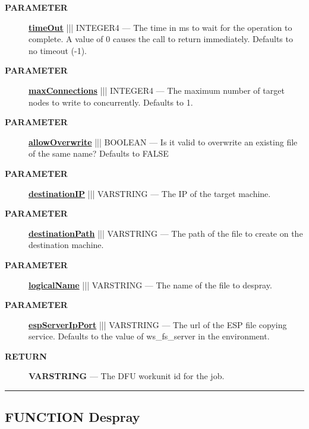 \par
\begin{description}
\item [\colorbox{tagtype}{\color{white} \textbf{\textsf{PARAMETER}}}] \textbf{\underline{timeOut}} ||| INTEGER4 --- The time in ms to wait for the operation to complete. A value of 0 causes the call to return immediately. Defaults to no timeout (-1).
\item [\colorbox{tagtype}{\color{white} \textbf{\textsf{PARAMETER}}}] \textbf{\underline{maxConnections}} ||| INTEGER4 --- The maximum number of target nodes to write to concurrently. Defaults to 1.
\item [\colorbox{tagtype}{\color{white} \textbf{\textsf{PARAMETER}}}] \textbf{\underline{allowOverwrite}} ||| BOOLEAN --- Is it valid to overwrite an existing file of the same name? Defaults to FALSE
\item [\colorbox{tagtype}{\color{white} \textbf{\textsf{PARAMETER}}}] \textbf{\underline{destinationIP}} ||| VARSTRING --- The IP of the target machine.
\item [\colorbox{tagtype}{\color{white} \textbf{\textsf{PARAMETER}}}] \textbf{\underline{destinationPath}} ||| VARSTRING --- The path of the file to create on the destination machine.
\item [\colorbox{tagtype}{\color{white} \textbf{\textsf{PARAMETER}}}] \textbf{\underline{logicalName}} ||| VARSTRING --- The name of the file to despray.
\item [\colorbox{tagtype}{\color{white} \textbf{\textsf{PARAMETER}}}] \textbf{\underline{espServerIpPort}} ||| VARSTRING --- The url of the ESP file copying service. Defaults to the value of ws\_fs\_server in the environment.
\end{description}







\par
\begin{description}
\item [\colorbox{tagtype}{\color{white} \textbf{\textsf{RETURN}}}] \textbf{VARSTRING} --- The DFU workunit id for the job.
\end{description}




\rule{\linewidth}{0.5pt}
\subsection*{\textsf{\colorbox{headtoc}{\color{white} FUNCTION}
Despray}}

